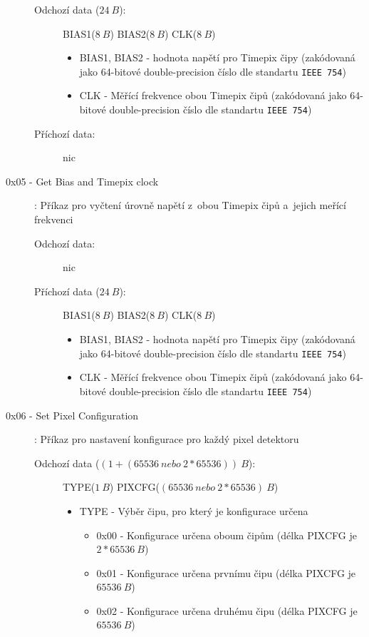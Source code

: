 \begin{description}
		\begin{description}
			\item[Odchozí data ($24~B$):] BIAS1($8~B$) BIAS2($8~B$) CLK($8~B$)
				\begin{itemize}
					\item BIAS1, BIAS2 - hodnota napětí pro Timepix čipy (zakódovaná jako 64-bitové double-precision číslo dle standartu \texttt{IEEE 754})
					\item CLK - Měřící frekvence obou Timepix čipů (zakódovaná jako 64-bitové double-precision číslo dle standartu \texttt{IEEE 754})
				\end{itemize}
			\item[Příchozí data:] nic
		\end{description}
	\item[0x05 - Get Bias and Timepix clock]:
		Příkaz pro vyčtení úrovně napětí z~obou Timepix čipů a~jejich meřící frekvenci
		\begin{description}
			\item[Odchozí data:] nic
			\item[Příchozí data ($24~B$):] BIAS1($8~B$) BIAS2($8~B$) CLK($8~B$)
				\begin{itemize}
					\item BIAS1, BIAS2 - hodnota napětí pro Timepix čipy (zakódovaná jako 64-bitové double-precision číslo dle standartu \texttt{IEEE 754})
					\item CLK - Měřící frekvence obou Timepix čipů (zakódovaná jako 64-bitové double-precision číslo dle standartu \texttt{IEEE 754})
				\end{itemize}
		\end{description}
	\item[0x06 - Set Pixel Configuration]:
		Příkaz pro nastavení konfigurace pro každý pixel detektoru
		\begin{description}
			\item[Odchozí data ($(1+(65536~nebo~2*65536))~B$):] TYPE($1~B$) PIXCFG($(65536~nebo~2*65536)~B$)
				\begin{itemize}
					\item TYPE - Výběr čipu, pro který je konfigurace určena
						\begin{itemize}
							\item 0x00 - Konfigurace určena oboum čipům (délka PIXCFG je $2*65536~B$)
							\item 0x01 - Konfigurace určena prvnímu čipu (délka PIXCFG je $65536~B$)
							\item 0x02 - Konfigurace určena druhému čipu (délka PIXCFG je $65536~B$)

\end{itemize}
\end{itemize}
\end{description}
\end{description}
